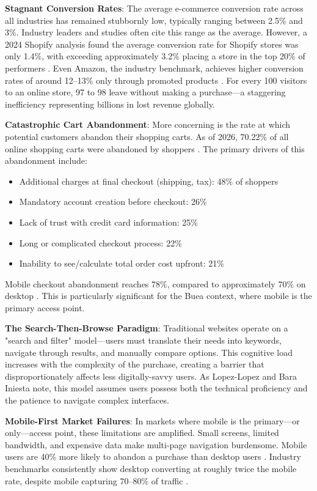 \documentclass[12pt,a4paper]{article}
\begin{document}
\textbf{Stagnant Conversion Rates}: The average e-commerce conversion rate across all industries has remained stubbornly low, typically ranging between 2.5\% and 3\%. Industry leaders and studies often cite this range as the average. However, a 2024 Shopify analysis found the average conversion rate for Shopify stores was only 1.4\%, with exceeding approximately 3.2\% placing a store in the top 20\% of performers \citep{shopify2024}. Even Amazon, the industry benchmark, achieves higher conversion rates of around 12--13\% only through promoted products \citep{amazon2025}. For every 100 visitors to an online store, 97 to 98 leave without making a purchase---a staggering inefficiency representing billions in lost revenue globally.

\textbf{Catastrophic Cart Abandonment}: More concerning is the rate at which potential customers abandon their shopping carts. As of 2026, 70.22\% of all online shopping carts were abandoned by shoppers \citep{statista2024, baymard2023}. The primary drivers of this abandonment include:

\begin{itemize}
    \item Additional charges at final checkout (shipping, tax): 48\% of shoppers
    \item Mandatory account creation before checkout: 26\%
    \item Lack of trust with credit card information: 25\%
    \item Long or complicated checkout process: 22\%
    \item Inability to see/calculate total order cost upfront: 21\%
\end{itemize}

Mobile checkout abandonment reaches 78\%, compared to approximately 70\% on desktop \citep{forrester2024}. This is particularly significant for the Buea context, where mobile is the primary access point.

\textbf{The Search-Then-Browse Paradigm}: Traditional websites operate on a "search and filter" model---users must translate their needs into keywords, navigate through results, and manually compare options. This cognitive load increases with the complexity of the purchase, creating a barrier that disproportionately affects less digitally-savvy users. As Lopez-Lopez and Bara Iniesta \citep{lopez2025} note, this model assumes users possess both the technical proficiency and the patience to navigate complex interfaces.

\textbf{Mobile-First Market Failures}: In markets where mobile is the primary---or only---access point, these limitations are amplified. Small screens, limited bandwidth, and expensive data make multi-page navigation burdensome. Mobile users are 40\% more likely to abandon a purchase than desktop users \citep{statista2024}. Industry benchmarks consistently show desktop converting at roughly twice the mobile rate, despite mobile capturing 70--80\% of traffic \citep{forrester2024}.
\end{document}
